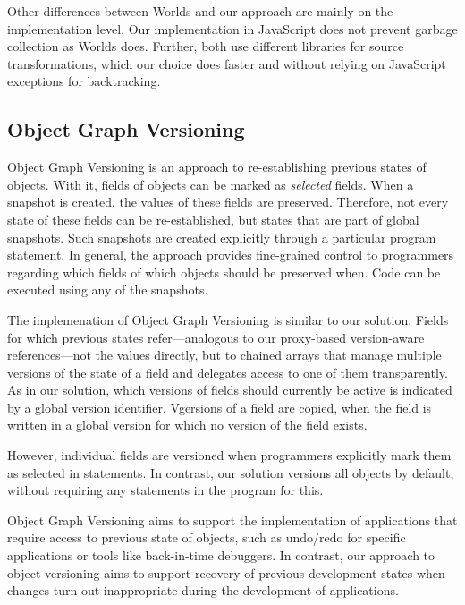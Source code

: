 Other differences between Worlds and our approach are mainly on the implementation level.
Our implementation in JavaScript does not prevent garbage collection as Worlds does.
Further, both use different libraries for source transformations, which our choice does faster and without relying on JavaScript exceptions for backtracking.


\subsection{Object Graph Versioning}

Object Graph Versioning\cite{Pluquet2009ECP} is an approach to re-establishing previous states of objects.
With it, fields of objects can be marked as \emph{selected} fields.
When a snapshot is created, the values of these fields are preserved.
Therefore, not every state of these fields can be re-established, but states that are part of global snapshots.
Such snapshots are created explicitly through a particular program statement.
In general, the approach provides fine-grained control to programmers regarding which fields of which objects should be preserved when.
Code can be executed using any of the snapshots. 

The implemenation of Object Graph Versioning is similar to our solution.
Fields for which previous states refer---analogous to our proxy-based version-aware references---not the values directly, but to chained arrays that manage multiple versions of the state of a field and delegates access to one of them transparently.
As in our solution, which versions of fields should currently be active is indicated by a global version identifier.
Vgersions of a field are copied, when the field is written in a global version for which no version of the field exists.

However, individual fields are versioned when programmers explicitly mark them as selected in statements.
In contrast, our solution versions all objects by default, without requiring any statements in the program for this.

Object Graph Versioning aims to support the implementation of applications that require access to previous state of objects, such as undo/redo for specific applications or tools like back-in-time debuggers.
In contrast, our approach to object versioning aims to support recovery of previous development states when changes turn out inappropriate during the development of applications.

